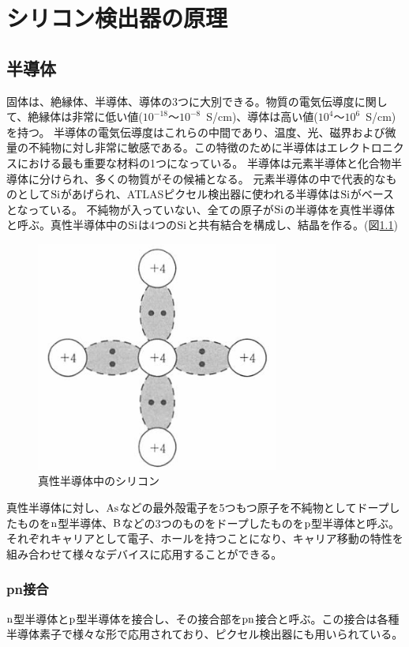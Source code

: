 
\chapter{シリコン検出器の原理}
\section{半導体\cite{2-1}}
固体は、絶縁体、半導体、導体の3つに大別できる。物質の電気伝導度に関して、絶縁体は非常に低い値($10^{-18}〜10^{-8}$~S/cm)、導体は高い値($10^{4}〜10^{6}$~S/cm)を持つ。
半導体の電気伝導度はこれらの中間であり、温度、光、磁界および微量の不純物に対し非常に敏感である。この特徴のために半導体はエレクトロニクスにおける最も重要な材料の1つになっている。
半導体は元素半導体と化合物半導体に分けられ、多くの物質がその候補となる。
元素半導体の中で代表的なものとして$\rm{Si}$があげられ、ATLASピクセル検出器に使われる半導体は$\rm{Si}$がベースとなっている。
不純物が入っていない、全ての原子が$\rm{Si}$の半導体を真性半導体と呼ぶ。真性半導体中の$\rm{Si}$は4つの$\rm{Si}$と共有結合を構成し、結晶を作る。(図\ref{pure_silicon})

\begin{figure}[bpt]\centering
\includegraphics[width=8cm]{./pure_silicon.png}
\caption[真性半導体中のシリコン]{真性半導体中のシリコン\cite{2-1}}
\label{pure_silicon}
\end{figure}

真性半導体に対し、$\rm{As}$などの最外殻電子を5つもつ原子を不純物としてドープしたものを$\rm{n}$型半導体、$\rm{B}$などの3つのものをドープしたものを$\rm{p}$型半導体と呼ぶ。
それぞれキャリアとして電子、ホールを持つことになり、キャリア移動の特性を組み合わせて様々なデバイスに応用することができる。

\subsection{pn接合}
$\rm{n}$型半導体と$\rm{p}$型半導体を接合し、その接合部を$\rm{pn}$接合と呼ぶ。この接合は各種半導体素子で様々な形で応用されており、ピクセル検出器にも用いられている。

